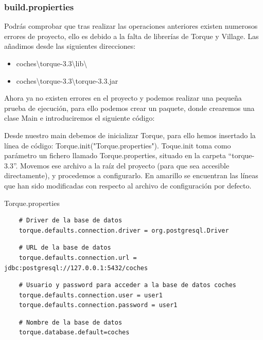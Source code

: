 \documentclass[24pt, a4paper, oneside, spanish]{beamer}
\begin{document}
\begin{frame}
	\frametitle{build.propierties}
	
	Podrás comprobar que tras realizar las operaciones anteriores existen numerosos errores de proyecto, ello es debido a la falta de librerías de Torque y Village. Las añadimos desde las siguientes direcciones:
	
	\begin{itemize}
		\item coches\textbackslash torque-3.3\textbackslash lib\textbackslash
		\item coches\textbackslash torque-3.3\textbackslash torque-3.3.jar
	\end{itemize}
	
	Ahora ya no existen errores en el proyecto y podemos realizar una pequeña prueba de ejecución, para ello podemos crear un paquete, donde crearemos una clase Main e introduciremos el siguiente código:
	
	
	Desde nuestro main debemos de inicializar Torque, para ello hemos insertado la línea de código: Torque.init("Torque.properties"). Toque.init toma como parámetro un fichero llamado Torque.properties, situado en la carpeta “torque-3.3”. Movemos ese archivo a la raíz del proyecto (para que sea accesible directamente), y procedemos a configurarlo. En amarillo se encuentran las líneas que han sido modificadas con respecto al archivo de configuración por defecto.
	
	Torque.properties
	\begin{lstlisting}
	# Driver de la base de datos
	torque.defaults.connection.driver = org.postgresql.Driver
	\end{lstlisting}
	
	\begin{lstlisting}
	# URL de la base de datos
	torque.defaults.connection.url = jdbc:postgresql://127.0.0.1:5432/coches
	\end{lstlisting}
	
	\begin{lstlisting}
	# Usuario y password para acceder a la base de datos coches
	torque.defaults.connection.user = user1
	torque.defaults.connection.password = user1
	\end{lstlisting}
	
	\begin{lstlisting}
	# Nombre de la base de datos
	torque.database.default=coches
	\end{lstlisting}
	

\end{frame}
\end{document}
